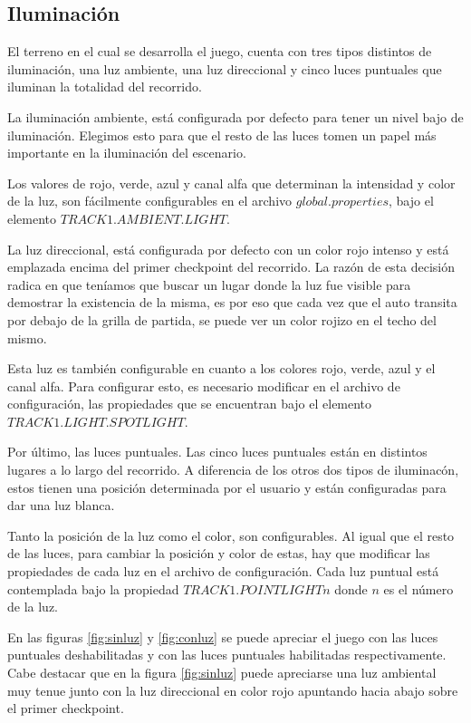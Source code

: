 \documentclass[a4paper,10pt]{article}
\begin{document}
\subsection{Iluminaci\'on}

El terreno en el cual se desarrolla el juego, cuenta con tres tipos distintos de
iluminaci\'on, una luz ambiente, una luz direccional y cinco luces puntuales que
iluminan la totalidad del recorrido.

La iluminaci\'on ambiente, est\'a configurada por defecto para tener un nivel
bajo de iluminaci\'on.  Elegimos esto para que el resto de las luces tomen un
papel m\'as importante en la iluminaci\'on del escenario.

Los valores de rojo, verde, azul y canal alfa que determinan la intensidad y
color de la luz, son f\'acilmente configurables en el archivo
$global.properties$, bajo el elemento $TRACK1.AMBIENT.LIGHT$.

La luz direccional, est\'a configurada por defecto con un color rojo intenso y
est\'a emplazada encima del primer checkpoint del recorrido. La raz\'on de esta
decisi\'on radica en que ten\'iamos que buscar un lugar donde la luz fue
visible para demostrar la existencia de la misma, es por eso que cada vez que
el auto transita por debajo de la grilla de partida, se puede ver un color
rojizo en el techo del mismo.

Esta luz es tambi\'en configurable en cuanto a los colores rojo, verde, azul y
el canal alfa.  Para configurar esto, es necesario modificar en el archivo de
configuraci\'on, las propiedades que se encuentran bajo el elemento
$TRACK1.LIGHT.SPOTLIGHT$.

Por \'ultimo, las luces puntuales.  Las cinco luces puntuales est\'an en
distintos lugares a lo largo del recorrido.  A diferencia de los otros dos
tipos de iluminac\'on, estos tienen una posici\'on determinada por el usuario y
est\'an configuradas para dar una luz blanca.

Tanto la posici\'on de la luz como el color, son configurables.  Al igual que
el resto de las luces, para cambiar la posici\'on y color de estas, hay que
modificar las propiedades de cada luz en el archivo de configuraci\'on.  Cada
luz puntual est\'a contemplada bajo la propiedad $TRACK1.POINTLIGHTn$ donde $n$
es el n\'umero de la luz.

En las figuras \ref{fig:sinluz} y \ref{fig:conluz} se puede apreciar el juego
con las luces puntuales deshabilitadas y con las luces puntuales habilitadas
respectivamente.  Cabe destacar que en la figura \ref{fig:sinluz} puede
apreciarse una luz ambiental muy tenue junto con la luz direccional en color
rojo apuntando hacia abajo sobre el primer checkpoint.
\end{document}
